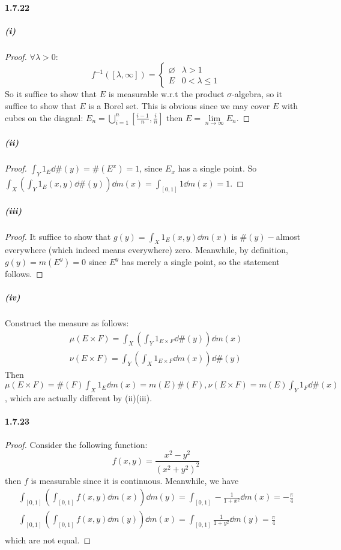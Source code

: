 \documentclass{article}
\begin{document}
\paragraph{1.7.22}
\subparagraph{(i)}
\begin{proof}
$\forall \lambda>0:$
\[f^{-1}([\lambda,\infty])=\begin{cases}\varnothing &\lambda>1\\E&0<\lambda\leq 1\end{cases}\]
So it suffice to show that $E$ is measurable w.r.t the product $\sigma$-algebra, so it suffice to show that $E$ is a Borel set.
This is obvious since we may cover $E$ with cubes on the diagnal: $E_n=\bigcup_{i=1}^n [\frac {i-1}{n},\frac{i}{n}]$ then $E=\lim\limits_{n\to\infty} E_n$.

\end{proof}
\subparagraph{(ii)}
\begin{proof}
$\int_Y 1_E\dd\#(y)=\#(E^x)=1$, since $E_x$ has a single point. So $\int_X(\int_Y 1_E(x,y)\dd\#(y))\dd m(x)=\int_{[0,1]}1\dd m(x)=1$.
\end{proof}
\subparagraph{(iii)}
\begin{proof}
It suffice to show that $g(y)=\int_X 1_E(x,y)\dd m(x)$ is $\#(y)-$almost everywhere (which indeed means everywhere) zero. Meanwhile, by definition, $g(y)=m(E^y)=0$ since $E^y$ has merely a single point, so the statement follows.
\end{proof}
\subparagraph{(iv)}
Construct the measure as follows:
\begin{gather*}
\mu(E\times F)=\int_X(\int_Y 1_{E\times F}\dd\#(y))\dd m(x)\\
\nu(E\times F)=\int_Y(\int_X 1_{E\times F}\dd m(x))\dd \#(y)
\end{gather*}
Then $\mu(E\times F)=\#(F)\int_X 1_E\dd m(x)=m(E)\#(F), \nu(E\times F)=m(E)\int_Y 1_F\dd \#(x)$, which are actually different by (ii)(iii).
\paragraph{1.7.23}
\begin{proof}
Consider the following function:
\[f(x,y)=\frac{x^2-y^2}{(x^2+y^2)^2}\]
then $f$ is measurable since it is continuous. Meanwhile, we have
\begin{gather*}
\int_{[0,1]}(\int_{[0,1]}f(x,y)\dd m(x))\dd m(y)=\int_{[0,1]}-\frac{1}{1+x^2}\dd m(x)=-\frac{\pi}{4}\\
\int_{[0,1]}(\int_{[0,1]}f(x,y)\dd m(y))\dd m(x)=\int_{[0,1]}\frac{1}{1+y^2}\dd m(y)=\frac{\pi}{4}\\
\end{gather*}
which are not equal.
\end{proof}
\end{document}
